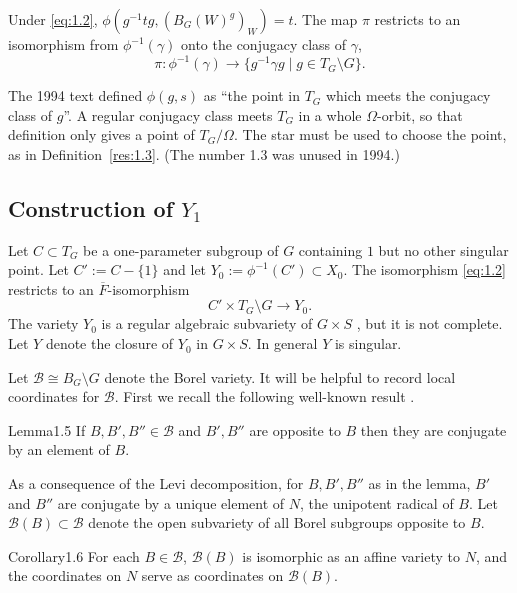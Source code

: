 \documentclass[12pt,letterpaper]{amsart}
\theoremstyle{plain}
\theoremstyle{definition}
\theoremstyle{remark}
\theoremstyle{definition}
\begin{document}
Under \eqref{eq:1.2}, $\phi(g^{-1}tg,(B_G(W)^g)_W)=t$. The map $\pi$
restricts to an isomorphism from $\phi^{-1}(\gamma)$ onto the
conjugacy class of $\gamma$,
\[
\pi:\phi^{-1}(\gamma)\rightarrow \{g^{-1}\gamma g \mid g\in T_G\setminus G\}.
\]

\begin{rem26}\label{rem:phi}
The 1994 text defined $\phi(g,s)$ as ``the point in $T_G$ which meets the
conjugacy class of $g$''. A regular conjugacy class meets $T_G$ in a whole
$\Omega$-orbit, so that definition only gives a point of $T_G/\Omega$. The
star must be used to choose the point, as in Definition~\ref{res:1.3}. (The
number 1.3 was unused in 1994.)
\end{rem26}

\subsection*{Construction of \texorpdfstring{$Y_1$}{Y1}}

Let $C\subset T_G$ be a one-parameter subgroup of $G$
containing $1$ but no other singular point.
Let $C':=C-\{1\}$
and let $Y_0:=\phi^{-1}(C')\subset X_0$. The isomorphism
\eqref{eq:1.2} restricts to an $\overline{F}$-isomorphism
\begin{equation}\tag{1.4}\label{eq:1.4}
C'\times T_G\setminus G\rightarrow Y_0.
\end{equation}
The variety $Y_0$ is a regular algebraic subvariety of $G\times S$
\cite[p.~480]{La83}, but it is not complete.
Let $Y$ denote the closure of $Y_0$ in $G\times S$. In general $Y$ is
singular.

Let ${\mathcal B}\cong B_G\setminus G$ denote the Borel variety.
It will be helpful to record local coordinates for ${\mathcal B}$.
First we recall the following
well-known result \cite[Ch.~IV, Corollary~14.13]{Bor91}.

\begin{res}{Lemma}{1.5}\label{res:1.5}
If $B,B',B''\in {\mathcal B}$ and $B', B''$ are opposite
to $B$ then they are conjugate by an element of $B$.
\end{res}

As a consequence of the Levi decomposition,
for $B, B',B''$ as in the lemma,
$B'$ and $B''$ are conjugate by a unique element of $N$, the unipotent
radical of $B$. Let ${\mathcal B}(B)\subset {\mathcal B}$
denote the open subvariety of all Borel subgroups
opposite to $B$.

\begin{res}{Corollary}{1.6}\label{res:1.6}
For each $B\in {\mathcal B}$, ${\mathcal B}(B)$
is isomorphic
as an affine variety to $N$, and the coordinates on $N$
serve as coordinates on ${\mathcal B}(B)$.
\end{res}
\end{document}
